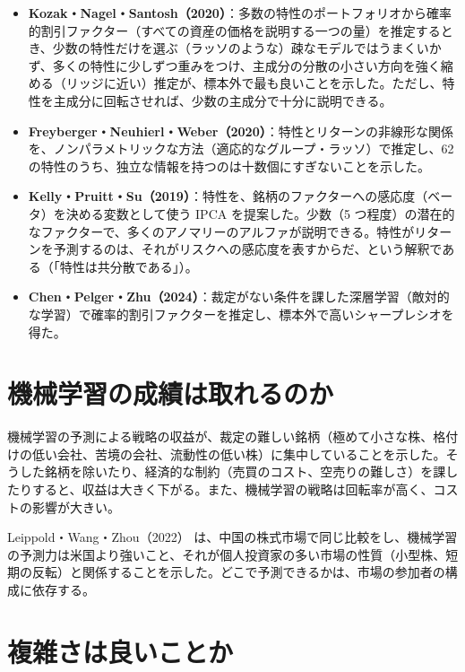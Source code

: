 \begin{itemize}
\item \textbf{Kozak・Nagel・Santosh（2020）}\cite{kns2020}：多数の特性のポートフォリオから確率的割引ファクター（すべての資産の価格を説明する一つの量）を推定するとき、少数の特性だけを選ぶ（ラッソのような）疎なモデルではうまくいかず、多くの特性に少しずつ重みをつけ、主成分の分散の小さい方向を強く縮める（リッジに近い）推定が、標本外で最も良いことを示した。ただし、特性を主成分に回転させれば、少数の主成分で十分に説明できる。
\item \textbf{Freyberger・Neuhierl・Weber（2020）}\cite{fnw2020}：特性とリターンの非線形な関係を、ノンパラメトリックな方法（適応的なグループ・ラッソ）で推定し、62 の特性のうち、独立な情報を持つのは十数個にすぎないことを示した。
\item \textbf{Kelly・Pruitt・Su（2019）}\cite{kps2019}：特性を、銘柄のファクターへの感応度（ベータ）を決める変数として使う IPCA を提案した。少数（5 つ程度）の潜在的なファクターで、多くのアノマリーのアルファが説明できる。特性がリターンを予測するのは、それがリスクへの感応度を表すからだ、という解釈である（「特性は共分散である」）。
\item \textbf{Chen・Pelger・Zhu（2024）}\cite{cpz2024}：裁定がない条件を課した深層学習（敵対的な学習）で確率的割引ファクターを推定し、標本外で高いシャープレシオを得た。
\end{itemize}

\section{機械学習の成績は取れるのか}

\begin{paperbox}
機械学習の予測による戦略の収益が、裁定の難しい銘柄（極めて小さな株、格付けの低い会社、苦境の会社、流動性の低い株）に集中していることを示した。そうした銘柄を除いたり、経済的な制約（売買のコスト、空売りの難しさ）を課したりすると、収益は大きく下がる。また、機械学習の戦略は回転率が高く、コストの影響が大きい。
\end{paperbox}

Leippold・Wang・Zhou（2022）\cite{lwz2022} は、中国の株式市場で同じ比較をし、機械学習の予測力は米国より強いこと、それが個人投資家の多い市場の性質（小型株、短期の反転）と関係することを示した。どこで予測できるかは、市場の参加者の構成に依存する。

\section{複雑さは良いことか}


